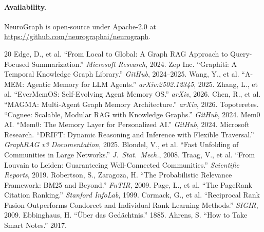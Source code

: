 \documentclass[11pt,twocolumn]{article}
\begin{document}
\paragraph{Availability.} NeuroGraph is open-source under Apache-2.0 at \url{https://github.com/neurographai/neurograph}.

\begin{thebibliography}{20}
 Edge, D., et al. ``From Local to Global: A Graph RAG Approach to Query-Focused Summarization.'' \textit{Microsoft Research}, 2024.
 Zep Inc. ``Graphiti: A Temporal Knowledge Graph Library.'' \textit{GitHub}, 2024--2025.
 Wang, Y., et al. ``A-MEM: Agentic Memory for LLM Agents.'' \textit{arXiv:2502.12345}, 2025.
 Zhang, L., et al. ``EverMemOS: Self-Evolving Agent Memory OS.'' \textit{arXiv}, 2026.
 Chen, R., et al. ``MAGMA: Multi-Agent Graph Memory Architecture.'' \textit{arXiv}, 2026.
 Topoteretes. ``Cognee: Scalable, Modular RAG with Knowledge Graphs.'' \textit{GitHub}, 2024.
 Mem0 AI. ``Mem0: The Memory Layer for Personalized AI.'' \textit{GitHub}, 2024.
 Microsoft Research. ``DRIFT: Dynamic Reasoning and Inference with Flexible Traversal.'' \textit{GraphRAG v3 Documentation}, 2025.
 Blondel, V., et al. ``Fast Unfolding of Communities in Large Networks.'' \textit{J.\ Stat.\ Mech.}, 2008.
 Traag, V., et al. ``From Louvain to Leiden: Guaranteeing Well-Connected Communities.'' \textit{Scientific Reports}, 2019.
 Robertson, S., Zaragoza, H. ``The Probabilistic Relevance Framework: BM25 and Beyond.'' \textit{FnTIR}, 2009.
 Page, L., et al. ``The PageRank Citation Ranking.'' \textit{Stanford InfoLab}, 1999.
 Cormack, G., et al. ``Reciprocal Rank Fusion Outperforms Condorcet and Individual Rank Learning Methods.'' \textit{SIGIR}, 2009.
 Ebbinghaus, H. ``\"Uber das Ged\"achtnis.'' 1885.
 Ahrens, S. ``How to Take Smart Notes.'' 2017.
\end{thebibliography}
\end{document}
